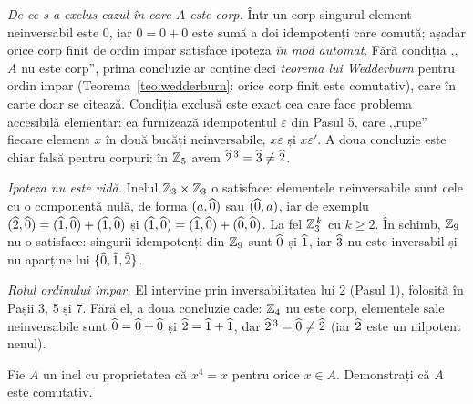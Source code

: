 \begin{obs}
\emph{De ce s-a exclus cazul în care $A$ este corp.} Într-un corp
singurul element neinversabil este $0$, iar $0=0+0$ este sumă a doi
idempotenți care comută; așadar orice corp finit de ordin impar
satisface ipoteza \emph{în mod automat}. Fără condiția ,,$A$ nu este
corp'', prima concluzie ar conține deci \emph{teorema lui Wedderburn}
pentru ordin impar (Teorema~\ref{teo:wedderburn}: orice corp finit este
comutativ), care în carte doar se citează. Condiția exclusă este exact
cea care face problema accesibilă elementar: ea furnizează idempotentul
$\varepsilon$ din Pasul 5, care ,,rupe'' fiecare element $x$ în două
bucăți neinversabile, $x\varepsilon$ și $x\varepsilon'$. A doua concluzie
este chiar falsă pentru corpuri: în $\mathbb{Z}_5$ avem $\widehat{2}^{\,3}=\widehat{3}\neq\widehat{2}$.

\emph{Ipoteza nu este vidă.} Inelul $\mathbb{Z}_3\times\mathbb{Z}_3$ o satisface:
elementele neinversabile sunt cele cu o componentă nulă, de forma
$(a,\widehat{0})$ sau $(\widehat{0},a)$, iar de exemplu
$(\widehat{2},\widehat{0})=(\widehat{1},\widehat{0})+(\widehat{1},\widehat{0})$ și
$(\widehat{1},\widehat{0})=(\widehat{1},\widehat{0})+(\widehat{0},\widehat{0})$. La fel $\mathbb{Z}_3^{\,k}$ cu $k\ge2$. În
schimb, $\mathbb{Z}_9$ nu o satisface: singurii idempotenți din $\mathbb{Z}_9$ sunt
$\widehat{0}$ și $\widehat{1}$, iar $\widehat{3}$ nu este inversabil și nu aparține lui
$\{\widehat{0},\widehat{1},\widehat{2}\}$.

\emph{Rolul ordinului impar.} El intervine prin inversabilitatea lui $2$
(Pasul 1), folosită în Pașii 3, 5 și 7. Fără el, a doua concluzie cade:
$\mathbb{Z}_4$ nu este corp, elementele sale neinversabile sunt
$\widehat{0}=\widehat{0}+\widehat{0}$ și $\widehat{2}=\widehat{1}+\widehat{1}$, dar $\widehat{2}^{\,3}=\widehat{0}\neq\widehat{2}$ (iar
$\widehat{2}$ este un nilpotent nenul).
\end{obs}

\begin{problema}
Fie $A$ un inel cu proprietatea că $x^{4}=x$ pentru orice $x\in A$.
Demonstrați că $A$ este comutativ.
\end{problema}

